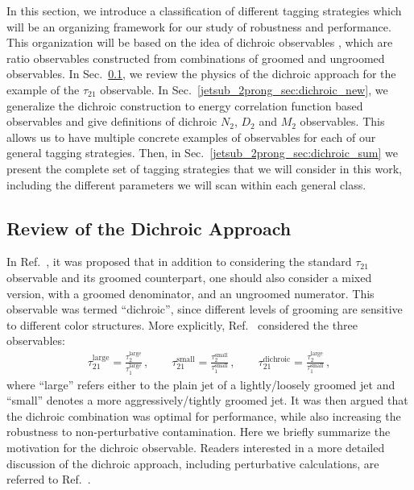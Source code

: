 \documentclass[11pt]{cernrep}
\begin{document}
In this section, we introduce a classification of different tagging strategies which will be an organizing framework for our study of robustness and performance.
%
This organization will be based on the idea of dichroic observables \cite{Salam:2016yht}, which are ratio observables constructed from combinations of groomed and ungroomed observables.
%
In Sec.~\ref{jetsub_2prong_sec:dichroic}, we review the physics of the dichroic approach for the example of the $\tau_{21}$ observable.
%
In Sec.~\ref{jetsub_2prong_sec:dichroic_new}, we generalize the dichroic construction to energy correlation function based observables and give definitions of dichroic $N_2$, $D_2$ and $M_2$ observables.
%
This allows us to have multiple concrete examples of observables for each of our general tagging strategies.
%
Then, in Sec.~\ref{jetsub_2prong_sec:dichroic_sum} we present the complete set of tagging strategies that we will consider in this work, including the different parameters we will scan within each general class.



\subsection{Review of the Dichroic Approach}\label{jetsub_2prong_sec:dichroic}


In Ref.~\cite{Salam:2016yht}, it was proposed that in addition to considering the standard $\tau_{21}$ observable and its groomed counterpart, one should also consider a mixed version, with a groomed denominator, and an ungroomed numerator.
%
This observable was termed ``dichroic'', since different levels of grooming are sensitive to different color structures.
%
More explicitly, Ref.~\cite{Salam:2016yht} considered the three observables:
%
%
\begin{align}
  \tau_{21}^{\text{large}} =\frac{\tau_2^{\text{large}}}{\tau_1^{\text{large}}}\,,
  \qquad
  \tau_{21}^{\text{small}} =\frac{\tau_2^{\text{small}}}{\tau_1^{\text{small}}}\,,
  \qquad
  \tau_{21}^{\text{dichroic}} =\frac{\tau_2^{\text{large}}}{\tau_1^{\text{small}}}\,,
\end{align}
where ``large'' refers either to the plain jet of a
lightly/loosely groomed jet and ``small'' denotes a more aggressively/tightly
groomed jet.
%
It was then argued that the dichroic combination was optimal for
performance, while also increasing the robustness to non-perturbative
contamination.
%
Here we briefly summarize the motivation for the dichroic observable.
%
Readers interested in a more detailed discussion of the dichroic approach, including perturbative calculations, are referred to Ref.~\cite{Salam:2016yht}.
\end{document}
